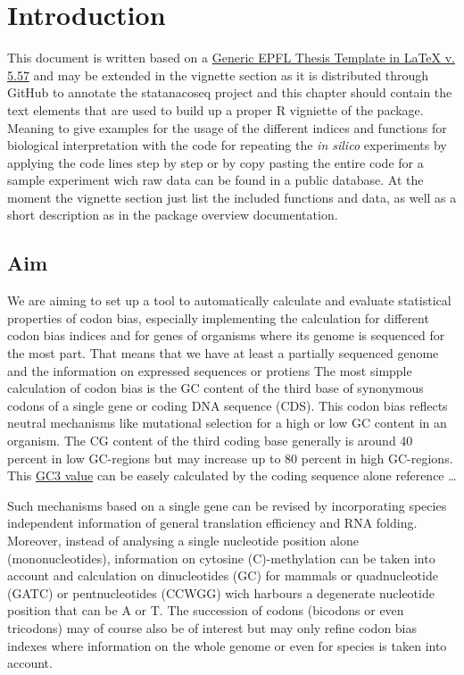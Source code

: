 \chapter*{Introduction}
This document is written based on a \href{http://phd.epfl.ch/thesistemplates}{Generic EPFL Thesis Template in LaTeX v. 5.57} and may be extended in the vignette section as it is distributed through GitHub to annotate the statanacoseq project and this chapter should contain the text elements that are used to build up a proper R vigniette of the package. Meaning to give examples for the usage of the different indices and functions for biological interpretation with the code for repeating the \textit{in silico} experiments by applying the code lines step by step or by copy pasting the entire code for a sample experiment wich raw data can be found in a public database. At the moment the vignette section just list the included functions and data, as well as a short description as in the package overview documentation.

\section{Aim}
We are aiming to set up a tool to automatically calculate and evaluate statistical properties of codon bias, especially implementing the calculation for different codon bias indices and for genes of organisms where its genome is sequenced for the most part. That means that we have at least a partially sequenced genome and the information on expressed sequences or protiens
The most simpple calculation of codon bias is the GC content of the third base of synonymous codons of a single gene or coding DNA sequence (CDS). This codon bias reflects neutral mechanisms like mutational selection for a high or low GC content in an organism. The CG content of the third coding base generally is around 40 percent in low GC-regions but may increase up to 80 percent in high GC-regions. This \hyperlink{function:G3C}{GC3 value} can be easely calculated by the coding sequence alone
reference \cite{Galtier2001} \dots

Such mechanisms based on a single gene can be revised by incorporating species independent information of general translation efficiency and RNA folding. Moreover, instead of analysing a single nucleotide position alone (mononucleotides), information on cytosine (C)-methylation can be taken into account and calculation on dinucleotides (GC) for mammals or quadnucleotide (GATC) or pentnucleotides (CCWGG) wich harbours a degenerate nucleotide position that can be A or T. The succession of codons (bicodons or even tricodons) may of course also be of interest but may only refine codon bias indexes where information on the whole genome or even for species is taken into account.

